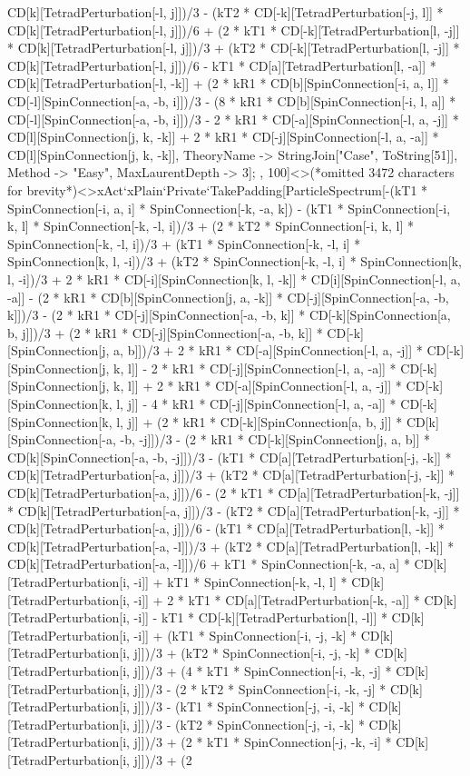 CD[k][TetradPerturbation[-l, j]])/3 - (kT2 * CD[-k][TetradPerturbation[-j, l]] * CD[k][TetradPerturbation[-l, j]])/6 + (2 * kT1 * CD[-k][TetradPerturbation[l, -j]] * CD[k][TetradPerturbation[-l, j]])/3 + (kT2 * CD[-k][TetradPerturbation[l, -j]] * CD[k][TetradPerturbation[-l, j]])/6 - kT1 * CD[a][TetradPerturbation[l, -a]] * CD[k][TetradPerturbation[-l, -k]] + (2 * kR1 * CD[b][SpinConnection[-i, a, l]] * CD[-l][SpinConnection[-a, -b, i]])/3 - (8 * kR1 * CD[b][SpinConnection[-i, l, a]] * CD[-l][SpinConnection[-a, -b, i]])/3 - 2 * kR1 * CD[-a][SpinConnection[-l, a, -j]] * CD[l][SpinConnection[j, k, -k]] + 2 * kR1 * CD[-j][SpinConnection[-l, a, -a]] * CD[l][SpinConnection[j, k, -k]], TheoryName -> StringJoin["Case", ToString[51]], Method -> "Easy", MaxLaurentDepth -> 3]; , 100]<>(*omitted 3472 characters for brevity*)<>xAct`xPlain`Private`TakePadding[ParticleSpectrum[-(kT1 * SpinConnection[-i, a, i] * SpinConnection[-k, -a, k]) - (kT1 * SpinConnection[-i, k, l] * SpinConnection[-k, -l, i])/3 + (2 * kT2 * SpinConnection[-i, k, l] * SpinConnection[-k, -l, i])/3 + (kT1 * SpinConnection[-k, -l, i] * SpinConnection[k, l, -i])/3 + (kT2 * SpinConnection[-k, -l, i] * SpinConnection[k, l, -i])/3 + 2 * kR1 * CD[-i][SpinConnection[k, l, -k]] * CD[i][SpinConnection[-l, a, -a]] - (2 * kR1 * CD[b][SpinConnection[j, a, -k]] * CD[-j][SpinConnection[-a, -b, k]])/3 - (2 * kR1 * CD[-j][SpinConnection[-a, -b, k]] * CD[-k][SpinConnection[a, b, j]])/3 + (2 * kR1 * CD[-j][SpinConnection[-a, -b, k]] * CD[-k][SpinConnection[j, a, b]])/3 + 2 * kR1 * CD[-a][SpinConnection[-l, a, -j]] * CD[-k][SpinConnection[j, k, l]] - 2 * kR1 * CD[-j][SpinConnection[-l, a, -a]] * CD[-k][SpinConnection[j, k, l]] + 2 * kR1 * CD[-a][SpinConnection[-l, a, -j]] * CD[-k][SpinConnection[k, l, j]] - 4 * kR1 * CD[-j][SpinConnection[-l, a, -a]] * CD[-k][SpinConnection[k, l, j]] + (2 * kR1 * CD[-k][SpinConnection[a, b, j]] * CD[k][SpinConnection[-a, -b, -j]])/3 - (2 * kR1 * CD[-k][SpinConnection[j, a, b]] * CD[k][SpinConnection[-a, -b, -j]])/3 - (kT1 * CD[a][TetradPerturbation[-j, -k]] * CD[k][TetradPerturbation[-a, j]])/3 + (kT2 * CD[a][TetradPerturbation[-j, -k]] * CD[k][TetradPerturbation[-a, j]])/6 - (2 * kT1 * CD[a][TetradPerturbation[-k, -j]] * CD[k][TetradPerturbation[-a, j]])/3 - (kT2 * CD[a][TetradPerturbation[-k, -j]] * CD[k][TetradPerturbation[-a, j]])/6 - (kT1 * CD[a][TetradPerturbation[l, -k]] * CD[k][TetradPerturbation[-a, -l]])/3 + (kT2 * CD[a][TetradPerturbation[l, -k]] * CD[k][TetradPerturbation[-a, -l]])/6 + kT1 * SpinConnection[-k, -a, a] * CD[k][TetradPerturbation[i, -i]] + kT1 * SpinConnection[-k, -l, l] * CD[k][TetradPerturbation[i, -i]] + 2 * kT1 * CD[a][TetradPerturbation[-k, -a]] * CD[k][TetradPerturbation[i, -i]] - kT1 * CD[-k][TetradPerturbation[l, -l]] * CD[k][TetradPerturbation[i, -i]] + (kT1 * SpinConnection[-i, -j, -k] * CD[k][TetradPerturbation[i, j]])/3 + (kT2 * SpinConnection[-i, -j, -k] * CD[k][TetradPerturbation[i, j]])/3 + (4 * kT1 * SpinConnection[-i, -k, -j] * CD[k][TetradPerturbation[i, j]])/3 - (2 * kT2 * SpinConnection[-i, -k, -j] * CD[k][TetradPerturbation[i, j]])/3 - (kT1 * SpinConnection[-j, -i, -k] * CD[k][TetradPerturbation[i, j]])/3 - (kT2 * SpinConnection[-j, -i, -k] * CD[k][TetradPerturbation[i, j]])/3 + (2 * kT1 * SpinConnection[-j, -k, -i] * CD[k][TetradPerturbation[i, j]])/3 + (2 